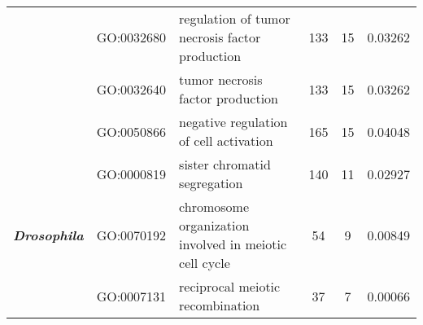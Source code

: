\begin{landscape}
\begin{longtable}[c]{@{}lllccr@{}}
		                                               & GO:0032680                         & regulation of tumor necrosis factor production                            & 133                                                                & 15                                                                   & 0.03262                                                                                  \\
		                                               & GO:0032640                         & tumor necrosis factor production                                          & 133                                                                & 15                                                                   & 0.03262                                                                                  \\
		                                               & GO:0050866                         & negative regulation of cell activation                                    & 165                                                                & 15                                                                   & 0.04048                                                                                  \\* \midrule
		\multirow{10}{*}{\textit{\textbf{Drosophila}}} & GO:0000819                         & sister chromatid segregation                                              & 140                                                                & 11                                                                   & 0.02927                                                                                  \\
		                                               & GO:0070192                         & chromosome organization involved in meiotic cell cycle                    & 54                                                                 & 9                                                                    & 0.00849                                                                                  \\
		                                               & GO:0007131                         & reciprocal meiotic recombination                                          & 37                                                                 & 7                                                                    & 0.00066                                                                                  \\

\end{longtable}
\end{landscape}
